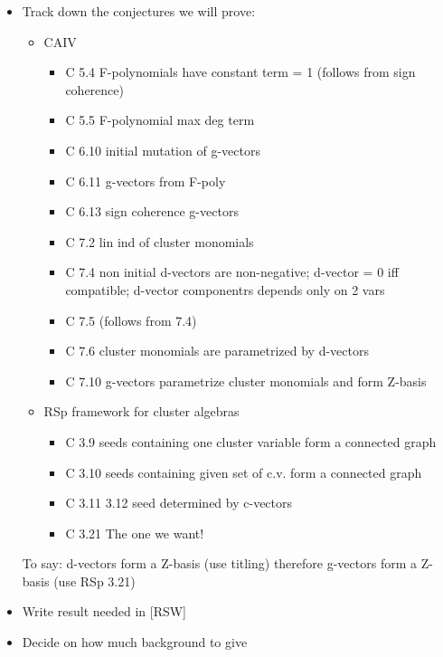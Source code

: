 \documentclass[12pt]{amsart}
\begin{document}
  \begin{itemize}
    \item
      Track down the conjectures we will prove:
		
		\begin{itemize}
		  \item CAIV
        \begin{itemize}
          \item C 5.4	F-polynomials have constant term = 1 (follows from sign coherence)
          \item C 5.5	F-polynomial max deg term
          \item C 6.10	initial mutation of g-vectors
          \item C 6.11	g-vectors from F-poly
          \item C 6.13	sign coherence g-vectors
          \item C 7.2	lin ind of cluster monomials
          \item C 7.4	non initial d-vectors are non-negative; d-vector = 0 iff compatible; 	d-vector componentrs depends only on 2 vars
          \item C 7.5	(follows from 7.4)
          \item C 7.6	cluster monomials are parametrized by d-vectors
          \item C 7.10	g-vectors parametrize cluster monomials and form Z-basis
        \end{itemize}
      
      \item RSp framework for cluster algebras
        \begin{itemize}
          \item   C 3.9		seeds containing one cluster variable form a connected graph
          \item   C 3.10		seeds containing given set of c.v. form a connected graph
          \item   C 3.11 3.12	seed determined by c-vectors
          \item   C 3.21		The one we want!
        \end{itemize}
    \end{itemize}


To say:
	d-vectors form a Z-basis (use titling)
	therefore g-vectors form a Z-basis (use RSp 3.21)



    \item
      Write result needed in [RSW]

    \item
      Decide on how much background to give

  \end{itemize}
\end{document}
